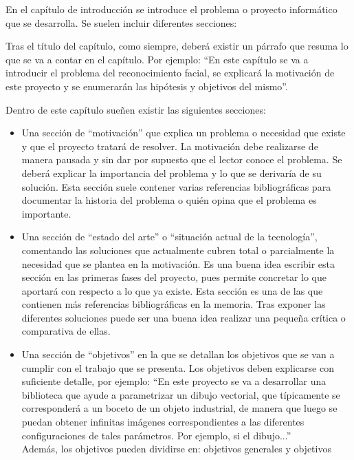 \documentclass[12pt,spanish,chapterprefix, numbers=noenddot]{book}
\numberwithin{equation}{section}
\numberwithin{figure}{section}
\begin{document}
    En el capítulo de introducción se introduce el problema o proyecto
    informático que se desarrolla. Se suelen incluir diferentes secciones:

    Tras el título del capítulo, como siempre, deberá existir un párrafo
    que resuma lo que se va a contar en el capítulo. Por ejemplo: ``En
    este capítulo se va a introducir el problema del reconocimiento facial,
    se explicará la motivación de este proyecto y se enumerarán las hipótesis
    y objetivos del mismo''.

    Dentro de este capítulo sueñen existir las siguientes secciones:
    \begin{itemize}
        \item Una sección de ``motivación'' que explica un problema o necesidad
        que existe y que el proyecto tratará de resolver. La motivación debe
        realizarse de manera pausada y sin dar por supuesto que el lector
        conoce el problema. Se deberá explicar la importancia del problema
        y lo que se derivaría de su solución. Esta sección suele contener
        varias referencias bibliográficas para documentar la historia del
        problema o quién opina que el problema es importante.
        \item Una sección de ``estado del arte'' o ``situación actual de la tecnología'',
        comentando las soluciones que actualmente cubren total o parcialmente
        la necesidad que se plantea en la motivación. Es una buena idea escribir
        esta sección en las primeras fases del proyecto, pues permite concretar
        lo que aportará con respecto a lo que ya existe. Esta sección es una
        de las que contienen más referencias bibliográficas en la memoria.
        Tras exponer las diferentes soluciones puede ser una buena idea realizar
        una pequeña crítica o comparativa de ellas.
        \item Una sección de ``objetivos'' en la que se detallan los objetivos
        que se van a cumplir con el trabajo que se presenta. Los objetivos
        deben explicarse con suficiente detalle, por ejemplo: ``En este proyecto
        se va a desarrollar una biblioteca que ayude a parametrizar un dibujo
        vectorial, que típicamente se corresponderá a un boceto de un objeto
        industrial, de manera que luego se puedan obtener infinitas imágenes
        correspondientes a las diferentes configuraciones de tales parámetros.
        Por ejemplo, si el dibujo...''\\
        Además, los objetivos pueden dividirse en: objetivos generales y objetivos

\end{itemize}
\end{document}
